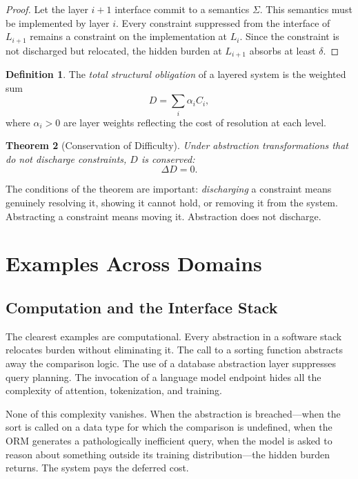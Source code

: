 \documentclass[12pt,a4paper,openany]{book}
\theoremstyle{plain}
\newtheorem{theorem}{Theorem}[chapter]
\theoremstyle{definition}
\newtheorem{definition}[theorem]{Definition}
\theoremstyle{remark}
\begin{document}
\begin{proof}
Let the layer $i+1$ interface commit to a semantics $\Sigma$. This semantics must be implemented by layer $i$. Every constraint suppressed from the interface of $L_{i+1}$ remains a constraint on the implementation at $L_i$. Since the constraint is not discharged but relocated, the hidden burden at $L_{i+1}$ absorbs at least $\delta$.
\end{proof}

\begin{definition}
\label{sec:formal_conservation}
The \emph{total structural obligation} of a layered system is the weighted sum
\[
D = \sum_i \alpha_i C_i,
\]
where $\alpha_i > 0$ are layer weights reflecting the cost of resolution at each level.
\end{definition}

\begin{theorem}[Conservation of Difficulty]
\label{thm:conservation}
Under abstraction transformations that do not discharge constraints, $D$ is conserved:
\[
\Delta D = 0.
\]
\end{theorem}

The conditions of the theorem are important: \emph{discharging} a constraint means genuinely resolving it, showing it cannot hold, or removing it from the system. Abstracting a constraint means moving it. Abstraction does not discharge.

\section{Examples Across Domains}

\subsection{Computation and the Interface Stack}

The clearest examples are computational. Every abstraction in a software stack relocates burden without eliminating it. The call to a sorting function abstracts away the comparison logic. The use of a database abstraction layer suppresses query planning. The invocation of a language model endpoint hides all the complexity of attention, tokenization, and training.

None of this complexity vanishes. When the abstraction is breached---when the sort is called on a data type for which the comparison is undefined, when the ORM generates a pathologically inefficient query, when the model is asked to reason about something outside its training distribution---the hidden burden returns. The system pays the deferred cost.
\end{document}
